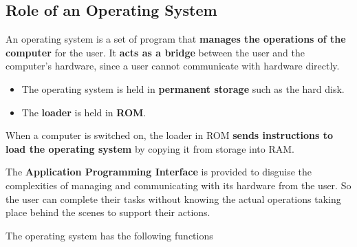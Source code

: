 \subsection{Role of an Operating System}

An operating system is a set of program that \textbf{manages the operations of the computer} for the user. It \textbf{acts as a bridge} between the user and the computer's hardware, since a user cannot communicate with hardware directly.

\begin{itemize}
    \item The operating system is held in \textbf{permanent storage} such as the hard disk.
    \item The \textbf{loader} is held in \textbf{ROM}.
\end{itemize}

When a computer is switched on, the loader in ROM \textbf{sends instructions to load the operating system} by copying it from storage into RAM.

The \textbf{Application Programming Interface} is provided to disguise the complexities of managing and communicating with its hardware from the user. So the user can complete their tasks without knowing the actual operations taking place behind the scenes to support their actions.

The operating system has the following functions

